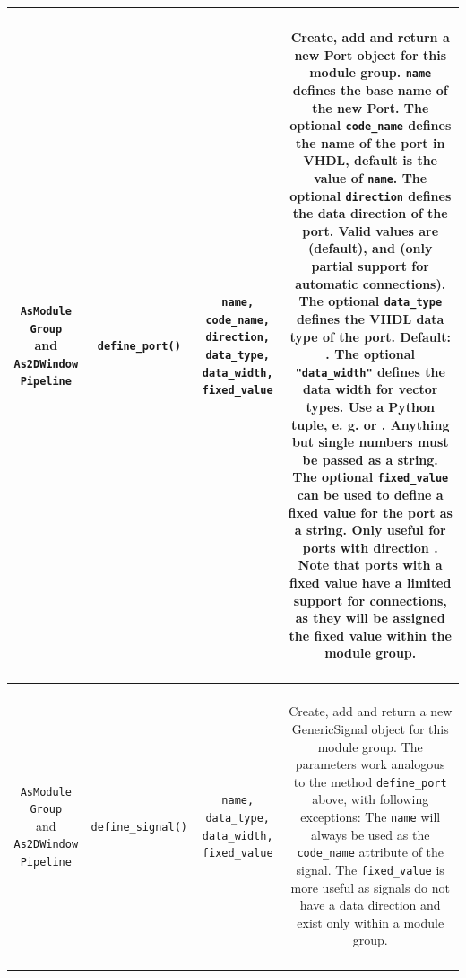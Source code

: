 \begin{longtable}[htbp]{|c|c|c|c|}
\parbox{2.5cm}{~\\ \texttt{AsModule Group} \\ and\\ \texttt{As2DWindow Pipeline}\\~} & \parbox{3cm}{~\\ \texttt{define\_port()}\\~} & \parbox{3cm}{~ \\ \texttt{name, code\_name, direction, data\_type, data\_width, fixed\_value} \\ ~} & \parbox{6cm}{~\\ Create, add and return a new Port object for this module group. \texttt{name} defines the base name of the new Port. The optional \texttt{code\_name} defines the name of the port in VHDL, default is the value of \texttt{name}. The optional \texttt{direction} defines the data direction of the port. Valid values are  (default),  and  (only partial support for automatic connections). The optional \texttt{data\_type} defines the VHDL data type of the port. Default: . The optional \texttt{"data\_width"} defines the data width for vector types. Use a Python tuple, e. g.  or . Anything but single numbers must be passed as a string. The optional \texttt{fixed\_value} can be used to define a fixed value for the port as a string. Only useful for ports with direction . Note that ports with a fixed value have a limited support for connections, as they will be assigned the fixed value within the module group. \\~}\\
\hline
\parbox{2.5cm}{~\\ \texttt{AsModule Group} \\ and\\ \texttt{As2DWindow Pipeline}\\~} & \parbox{3cm}{~\\ \texttt{define\_signal()}\\~} & \parbox{3cm}{~ \\ \texttt{name, data\_type, data\_width, fixed\_value} \\ ~} & \parbox{6cm}{~\\ Create, add and return a new GenericSignal object for this module group. The parameters work analogous to the method \texttt{define\_port} above, with following exceptions: The \texttt{name} will always be used as the \texttt{code\_name} attribute of the signal. The \texttt{fixed\_value} is more useful as signals do not have a data direction and exist only within a module group. \\~}\\
\hline


\end{longtable}

